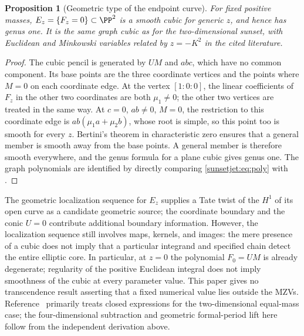 \documentclass[11pt,a4paper,oneside]{article}
\theoremstyle{plain}
\newtheorem{proposition}[theorem]{Proposition}
\theoremstyle{definition}
\theoremstyle{remark}
\numberwithin{equation}{section}
\begin{document}
\begin{proposition}[Geometric type of the endpoint curve]\label{sunsetjet:prop:elliptic}
For fixed positive masses, $E_z=\{F_z=0\}\subset\PP^2$ is a smooth cubic for generic $z$,
and hence has genus one. It is the same graph cubic as for the two-dimensional sunset,
with Euclidean and Minkowski variables related by $z=-K^2$ in the cited literature.
\end{proposition}
\begin{proof}
The cubic pencil is generated by $UM$ and $abc$, which have no common component.
Its base points are the three coordinate vertices and the points where $M=0$ on each coordinate edge.
At the vertex $[1:0:0]$, the linear coefficients of $F_z$ in the other two coordinates are both $\mu_1\ne0$;
the other two vertices are treated in the same way.
At $c=0$, $ab\ne0$, $M=0$, the restriction to this coordinate edge is
$ab(\mu_1a+\mu_2b)$, whose root is simple, so this point too is smooth for every $z$.
Bertini's theorem in characteristic zero ensures that a general member is smooth away from the base points.
A general member is therefore smooth everywhere, and the genus formula for a plane cubic gives genus one.
The graph polynomials are identified by directly comparing \eqref{sunsetjet:eq:poly} with \cite[Eqs.~(2.5)--(2.6)]{bv}.
\end{proof}

The geometric localization sequence for $E_z$ supplies a Tate twist of the $H^1$ of its open curve as a candidate geometric source;
the coordinate boundary and the conic $U=0$ contribute additional boundary information.
However, the localization sequence still involves maps, kernels, and images: the mere presence of a cubic
does not imply that a particular integrand and specified chain detect the entire elliptic core.
In particular, at $z=0$ the polynomial $F_0=UM$ is already degenerate;
regularity of the positive Euclidean integral does not imply smoothness of the cubic at every parameter value.
This paper gives no transcendence result asserting that a fixed numerical value lies outside the MZVs.
Reference~\cite{bv} primarily treats closed expressions for the two-dimensional equal-mass case;
the four-dimensional subtraction and geometric formal-period lift here follow from the independent derivation above.
\end{document}

